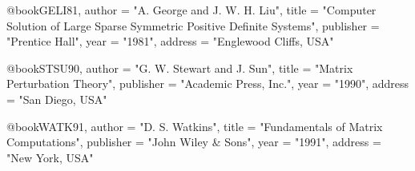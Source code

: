 @book{GELI81,
   author       = "A. George and J. W. H. Liu",
   title        = "Computer Solution of Large Sparse Symmetric
                   Positive Definite Systems",
   publisher    = "Prentice Hall",
   year         = "1981",
   address      = "Englewood Cliffs, USA"}

@book{STSU90,
   author       = "G. W. Stewart and J. Sun",
   title        = "Matrix Perturbation Theory",
   publisher    = "Academic Press, Inc.",
   year         = "1990",
   address      = "San Diego, USA"}

@book{WATK91,
   author       = "D. S. Watkins",
   title        = "Fundamentals of Matrix Computations",
   publisher    = "John Wiley \& Sons",
   year         = "1991",
   address      = "New York, USA"}
